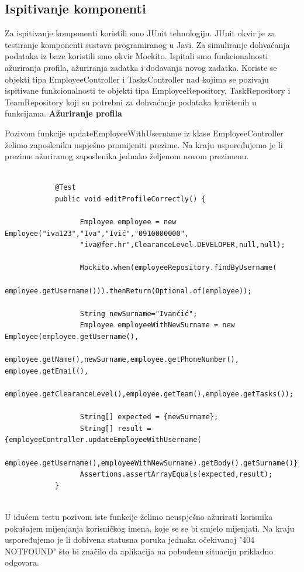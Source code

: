 		
		\subsection{Ispitivanje komponenti}
		Za ispitivanje komponenti koristili smo JUnit tehnologiju. JUnit okvir je za testiranje komponenti sustava programiranog u Javi. Za simuliranje dohvaćanja podataka iz baze koristili smo okvir Mockito. Ispitali smo funkcionalnosti ažuriranja profila, ažuriranja zadatka i dodavanja novog zadatka. Koriste se objekti tipa EmployeeController i TasksController nad kojima se pozivaju ispitivane funkcionalnosti te objekti tipa EmployeeRepository, TaskRepository i TeamRepository koji su potrebni za dohvaćanje podataka korištenih u funkcijama.
		\newline
		\newline
		\textbf{Ažuriranje profila}
		
		Pozivom funkcije updateEmployeeWithUsername iz klase EmployeeController želimo zaposleniku uspješno promijeniti prezime. Na kraju uspoređujemo je li prezime ažuriranog zaposlenika jednako željenom novom prezimenu.
		\begin{verbatim}
			
			@Test
			public void editProfileCorrectly() {
				  
				  Employee employee = new   Employee("iva123","Iva","Ivić","0910000000",
				  "iva@fer.hr",ClearanceLevel.DEVELOPER,null,null);
				
				  Mockito.when(employeeRepository.findByUsername(
				  employee.getUsername())).thenReturn(Optional.of(employee));
				
				  String newSurname="Ivančić";
				  Employee employeeWithNewSurname = new Employee(employee.getUsername(),
				  employee.getName(),newSurname,employee.getPhoneNumber(), employee.getEmail(),
				  employee.getClearanceLevel(),employee.getTeam(),employee.getTasks());
				
				  String[] expected = {newSurname};
				  String[] result = {employeeController.updateEmployeeWithUsername(
					  employee.getUsername(),employeeWithNewSurname).getBody().getSurname()};
				  Assertions.assertArrayEquals(expected,result);
			}
			
		\end{verbatim}
		U idućem testu pozivom iste funkcije želimo neuspješno ažurirati korisnika pokušajem mijenjanja korisničkog imena, koje se se bi smjelo mijenjati. Na kraju uspoređujemo je li dobivena statusna poruka jednaka očekivanoj "404 NOT\textunderscore FOUND" što bi značilo da aplikacija na pobuđenu situaciju prikladno odgovara.
		
